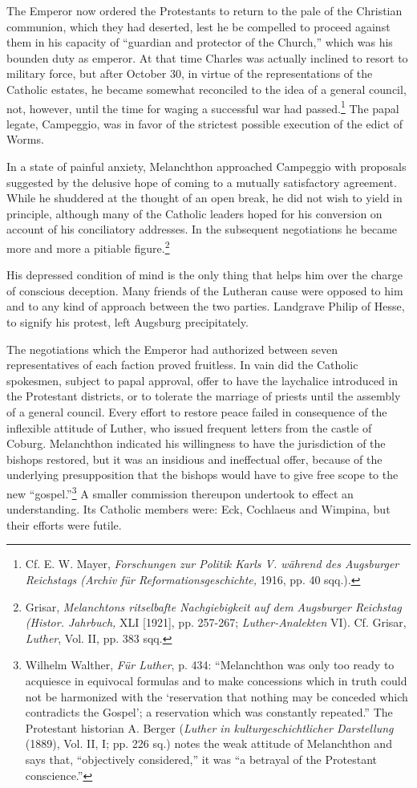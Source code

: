 The Emperor now ordered the Protestants to return to the pale of
the Christian communion, which they had deserted, lest he be compelled
to proceed against them in his capacity of “guardian and protector of
the Church,” which was his bounden duty as emperor. At
that time Charles was actually inclined to resort to military force,
but after October 30, in virtue of the representations of the Catholic
estates, he became somewhat reconciled to the idea of a general
council, not, however, until the time for waging a successful war had
passed.\footnote
{Cf. E. W. Mayer, \textit{Forschungen zur Politik Karls V. während des Augsburger Reichstags (Archiv für Reformationsgeschichte,} 1916, pp. 40 sqq.).}
The papal legate, Campeggio, was in favor of the strictest possible
execution of the edict of Worms.

In a state of painful anxiety, Melanchthon approached Campeggio
with proposals suggested by the delusive hope of coming to a mutually
satisfactory agreement. While he shuddered at the thought of an open
break, he did not wish to yield in principle, although many of the
Catholic leaders hoped for his conversion on account of his conciliatory
addresses. In the subsequent negotiations he became more and
more a pitiable figure.\footnote
{Grisar, \textit{Melanchtons ritselbafte Nachgiebigkeit auf dem Augsburger Reichstag (Histor.
Jahrbuch,} XLI [1921], pp. 257-267; \textit{Luther-Analekten} VI). Cf. Grisar, \textit{Luther}, Vol. II,
pp. 383 sqq.}

His depressed condition of mind is the only
thing that helps him over the charge of conscious deception. Many
friends of the Lutheran cause were opposed to him and to any kind of
approach between the two parties. Landgrave Philip of Hesse, to
signify his protest, left Augsburg precipitately.

The negotiations which the Emperor had authorized between seven
representatives of each faction proved fruitless. In vain did the
Catholic spokesmen, subject to papal approval, offer to have the laychalice
introduced in the Protestant districts, or to tolerate the marriage of
priests until the assembly of a general council. Every effort to
restore peace failed in consequence of the inflexible attitude of Luther,
who issued frequent letters from the castle of Coburg. Melanchthon
indicated his willingness to have the jurisdiction of the bishops restored,
but it was an insidious and ineffectual offer, because of the
underlying presupposition that the bishops would have to give free
scope to the new “gospel.”\footnote
{Wilhelm Walther, \textit{Für Luther}, p. 434: “Melanchthon was only too ready to acquiesce
in equivocal formulas and to make concessions which in truth could not be harmonized
with the ‘reservation that nothing may be conceded which contradicts the Gospel’; a reservation
which was constantly repeated.” The Protestant historian A. Berger (\textit{Luther
in kulturgeschichtlicher Darstellung} (1889), Vol. II, I; pp. 226 sq.) notes the weak attitude
of Melanchthon and says that, “objectively considered,” it was “a betrayal of the
Protestant conscience.”}
A smaller commission thereupon undertook
to effect an understanding. Its Catholic members were: Eck,
Cochlaeus and Wimpina, but their efforts were futile.

